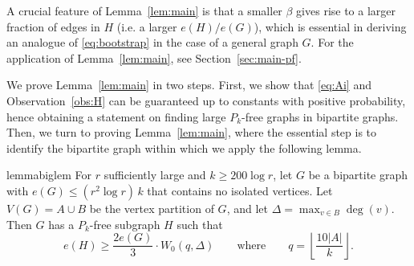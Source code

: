 \documentclass[12pt,reqno]{amsart}
\theoremstyle{remark}
\numberwithin{theorem}{section}
\renewcommand{\(}{\bigl(}
\renewcommand{\)}{\bigr)\vphantom{)}}
\renewcommand{\leq}{\le}
\renewcommand{\geq}{\ge}
\renewcommand{\le}{\leqslant}
\renewcommand{\ge}{\geqslant}
\begin{document}
A crucial feature of Lemma~\ref{lem:main} is that a smaller $\beta$ gives rise to a larger fraction of edges in $H$ (i.e. a larger $e(H)/e(G)$), which is essential in deriving an analogue of \eqref{eq:bootstrap} in the case of a general graph $G$. For the application of Lemma~\ref{lem:main}, see Section~\ref{sec:main-pf}.

We prove Lemma~\ref{lem:main} in two steps. First, we show that \eqref{eq:Ai} and Observation~\ref{obs:H} can be guaranteed up to constants with positive probability, hence obtaining a statement on finding large $P_k$-free graphs in bipartite graphs. Then, we turn to proving Lemma~\ref{lem:main}, where the essential step is to identify the bipartite graph within which we apply the following lemma.

\begin{restatable}{lemma}{biglem}\label{lem:bipartite-finding}
    For $r$ sufficiently large and $k\geq 200\log r$, let $G$ be a bipartite graph with $e(G) \leq (r^2 \log r)\,k$ that contains no isolated vertices. Let $V(G)=A\cup B$ be the vertex partition of $G$, and let $\Delta = \max_{v \in B} \deg(v)$. Then $G$ has a $P_k$-free subgraph $H$ such that
    \[e(H)\geq \frac{2e(G)}{3}\cdot W_0(q,\Delta) \qquad \text{where} \qquad q = \left \lfloor \frac{10|A|}{k}\right\rfloor.\]
\end{restatable}
\end{document}
